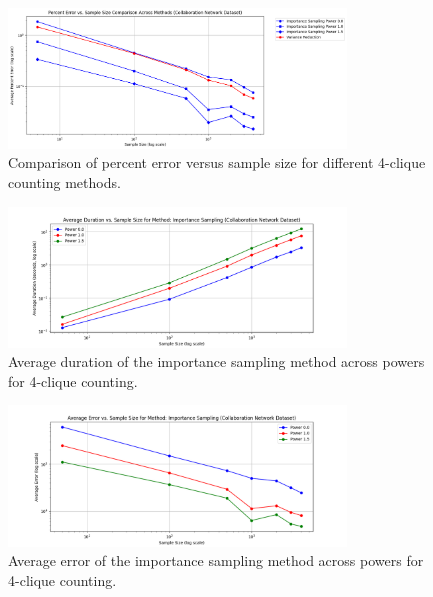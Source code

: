 \documentclass[11pt]{article}
\begin{document}
\begin{figure}[H]
    \centering
    \includegraphics[width=0.8\textwidth]{plots/4-clique/comparison/percent_error_vs_sample_size_comparison.png}
    \caption{Comparison of percent error versus sample size for different 4-clique counting methods.}
    \label{fig:4_clique_percent_error_sample_size_comparison}
\end{figure}

\begin{figure}[H]
    \centering
    \includegraphics[width=0.8\textwidth]{plots/4-clique/importance-sampling/avg_duration_Importance Sampling.png}
    \caption{Average duration of the importance sampling method across powers for 4-clique counting.}
    \label{fig:4_clique_avg_duration_importance_sampling}
\end{figure}

\begin{figure}[H]
    \centering
    \includegraphics[width=0.8\textwidth]{plots/4-clique/importance-sampling/avg_error_Importance Sampling.png}
    \caption{Average error of the importance sampling method across powers for 4-clique counting.}
    \label{fig:4_clique_avg_error_importance_sampling}
\end{figure}
\end{document}
